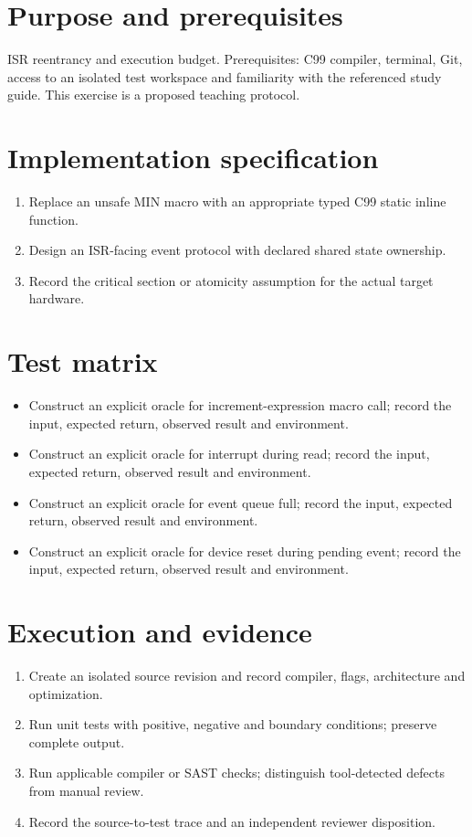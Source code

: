 \documentclass[10pt,letterpaper]{article}
\begin{document}
\makedoctitle
\makedocsummary
\section{Purpose and prerequisites}
ISR reentrancy and execution budget. Prerequisites: C99 compiler, terminal, Git, access to an isolated test workspace and familiarity with the referenced study guide. This exercise is a proposed teaching protocol.
\section{Implementation specification}
\begin{enumerate}
\item Replace an unsafe MIN macro with an appropriate typed C99 static inline function.
\item Design an ISR-facing event protocol with declared shared state ownership.
\item Record the critical section or atomicity assumption for the actual target hardware.
\end{enumerate}

\section{Test matrix}
\begin{itemize}
\item Construct an explicit oracle for increment-expression macro call; record the input, expected return, observed result and environment.
\item Construct an explicit oracle for interrupt during read; record the input, expected return, observed result and environment.
\item Construct an explicit oracle for event queue full; record the input, expected return, observed result and environment.
\item Construct an explicit oracle for device reset during pending event; record the input, expected return, observed result and environment.
\end{itemize}

\section{Execution and evidence}
\begin{enumerate}
\item Create an isolated source revision and record compiler, flags, architecture and optimization.
\item Run unit tests with positive, negative and boundary conditions; preserve complete output.
\item Run applicable compiler or SAST checks; distinguish tool-detected defects from manual review.
\item Record the source-to-test trace and an independent reviewer disposition.
\end{enumerate}
\end{document}
